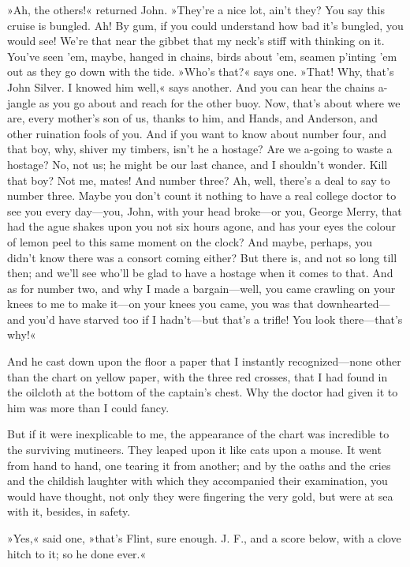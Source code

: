 »Ah, the others!« returned John. »They're a nice lot, ain't they? You say this cruise is bungled. Ah! By gum, if you could understand how bad it's bungled, you would see! We're that near the gibbet that my neck's stiff with thinking on it. You've seen 'em, maybe, hanged in chains, birds about 'em, seamen p'inting 'em out as they go down with the tide. »Who's that?« says one. »That! Why, that's John Silver. I knowed him well,« says another. And you can hear the chains a-jangle as you go about and reach for the other buoy. Now, that's about where we are, every mother's son of us, thanks to him, and Hands, and Anderson, and other ruination fools of you. And if you want to know about number four, and that boy, why, shiver my timbers, isn't he a hostage? Are we a-going to waste a hostage? No, not us; he might be our last chance, and I shouldn't wonder. Kill that boy? Not me, mates! And number three? Ah, well, there's a deal to say to number three. Maybe you don't count it nothing to have a real college doctor to see you every day—you, John, with your head broke—or you, George Merry, that had the ague shakes upon you not six hours agone, and has your eyes the colour of lemon peel to this same moment on the clock? And maybe, perhaps, you didn't know there was a consort coming either? But there is, and not so long till then; and we'll see who'll be glad to have a hostage when it comes to that. And as for number two, and why I made a bargain—well, you came crawling on your knees to me to make it—on your knees you came, you was that downhearted—and you'd have starved too if I hadn't—but that's a trifle! You look there—that's why!«

And he cast down upon the floor a paper that I instantly recognized—none other than the chart on yellow paper, with the three red crosses, that I had found in the oilcloth at the bottom of the captain's chest. Why the doctor had given it to him was more than I could fancy.

But if it were inexplicable to me, the appearance of the chart was incredible to the surviving mutineers. They leaped upon it like cats upon a mouse. It went from hand to hand, one tearing it from another; and by the oaths and the cries and the childish laughter with which they accompanied their examination, you would have thought, not only they were fingering the very gold, but were at sea with it, besides, in safety.

»Yes,« said one, »that's Flint, sure enough. J. F., and a score below, with a clove hitch to it; so he done ever.«

